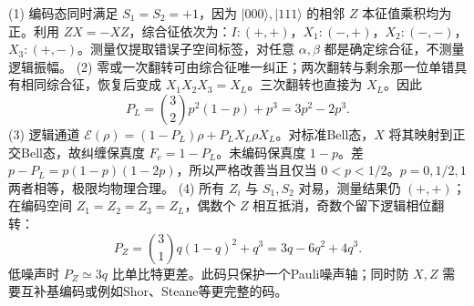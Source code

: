 (1) 编码态同时满足 \(S_1=S_2=+1\)，因为 \(|000\rangle,|111\rangle\) 的相邻 \(Z\) 本征值乘积均为正。利用 \(ZX=-XZ\)，综合征依次为：\(I:(+,+)\)，\(X_1:(-,+)\)，\(X_2:(-,-)\)，\(X_3:(+,-)\)。测量仅提取错误子空间标签，对任意 \(\alpha,\beta\) 都是确定综合征，不测量逻辑振幅。
(2) 零或一次翻转可由综合征唯一纠正；两次翻转与剩余那一位单错具有相同综合征，恢复后变成 \(X_1X_2X_3=X_L\)。三次翻转也直接为 \(X_L\)。因此
\[
P_L=\binom32p^2(1-p)+p^3=3p^2-2p^3.
\]
(3) 逻辑通道 \(\mathcal E(\rho)=(1-P_L)\rho+P_LX_L\rho X_L\)。对标准Bell态，\(X\) 将其映射到正交Bell态，故纠缠保真度 \(F_e=1-P_L\)。未编码保真度 \(1-p\)。差 \(p-P_L=p(1-p)(1-2p)\)，所以严格改善当且仅当 \(0<p<1/2\)。\(p=0,1/2,1\) 两者相等，极限均物理合理。
(4) 所有 \(Z_i\) 与 \(S_1,S_2\) 对易，测量结果仍 \((+,+)\)；在编码空间 \(Z_1=Z_2=Z_3=Z_L\)，偶数个 \(Z\) 相互抵消，奇数个留下逻辑相位翻转：
\[
P_Z=\binom31q(1-q)^2+q^3=3q-6q^2+4q^3.
\]
低噪声时 \(P_Z\simeq3q\) 比单比特更差。此码只保护一个Pauli噪声轴；同时防 \(X,Z\) 需要互补基编码或例如Shor、Steane等更完整的码。
